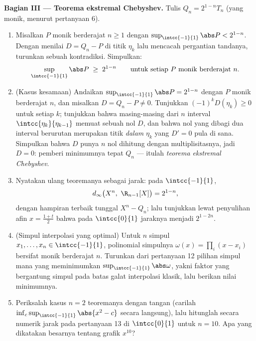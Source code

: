 \begin{problem}
\medskip
\noindent\textbf{Bagian III --- Teorema ekstremal Chebyshev.}
Tulis $Q_n = 2^{1-n}T_n$ (yang monik, menurut pertanyaan 6).
\begin{enumerate}[resume]
  \item Misalkan $P$ monik berderajat $n \geq 1$ dengan
        $\sup_{\intcc{-1}{1}}\abs P < 2^{1-n}$. Dengan menilai $D
        = Q_n - P$ di titik $\eta_k$ lalu mencacah pergantian
        tandanya, turunkan sebuah kontradiksi. Simpulkan:
        \[
        \sup_{\intcc{-1}{1}}\abs P \;\geq\; 2^{1-n}
        \qquad\text{untuk setiap } P \text{ monik berderajat } n.
        \]
  \item (Kasus kesamaan) Andaikan $\sup_{\intcc{-1}{1}}\abs P =
        2^{1-n}$ dengan $P$ monik berderajat $n$, dan misalkan $D = Q_n
        - P \neq 0$. Tunjukkan $(-1)^kD(\eta_k) \geq 0$ untuk setiap $k$;
        tunjukkan bahwa masing-masing dari $n$ interval
        $\intcc{\eta_{k}}{\eta_{k-1}}$ memuat sebuah nol $D$,
        dan bahwa nol yang dibagi dua interval berurutan merupakan
        titik \emph{dalam} $\eta_k$ yang $D' = 0$ pula di sana.
        Simpulkan bahwa $D$ punya $n$ nol dihitung dengan
        multiplisitasnya, jadi $D = 0$: pemberi minimumnya tepat
        $Q_n$ --- itulah \emph{teorema ekstremal Chebyshev}.
  \item Nyatakan ulang teoremanya sebagai jarak: pada $\intcc{-1}{1}$,
        \[
        d_\infty\bigl(X^n,\ \R_{n-1}[X]\bigr) = 2^{1-n},
        \]
        dengan hampiran terbaik tunggal $X^n - Q_n$; lalu tunjukkan
        lewat penyulihan afin $x = \frac{1+t}2$ bahwa pada
        $\intcc{0}{1}$ jaraknya menjadi $2^{1-2n}$.
  \item (Simpul interpolasi yang optimal) Untuk $n$ simpul $x_1, \dots,
        x_n \in \intcc{-1}{1}$, polinomial simpulnya
        $\omega(x) = \prod_i(x - x_i)$ bersifat monik berderajat $n$.
        Turunkan dari pertanyaan 12 pilihan simpul mana yang
        meminimumkan $\sup_{\intcc{-1}{1}}\abs\omega$, yakni faktor
        yang bergantung simpul pada batas galat interpolasi klasik, lalu
        berikan nilai minimumnya.
  \item Periksalah kasus $n = 2$ teoremanya dengan tangan (carilah
        $\inf_c \sup_{\intcc{-1}{1}}\abs{x^2 - c}$ secara langsung),
        lalu hitunglah secara numerik jarak pada pertanyaan 13 di
        $\intcc{0}{1}$ untuk $n = 10$. Apa yang dikatakan besarnya
        tentang grafik $x^{10}$?
\end{enumerate}


\end{problem}
